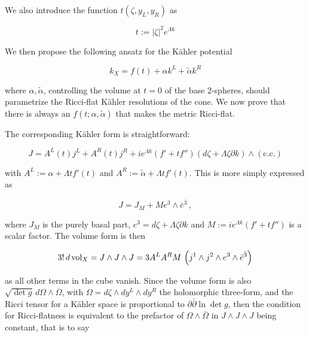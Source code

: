 We also introduce the function $t(\zeta,y_L,y_R)$ as 

\begin{equation}
	t := |\zeta|^2 e^{\Lambda k}
\end{equation}

We then propose the following ansatz for the K\"ahler potential

\begin{equation}
	k_X = f(t) + \alpha k^L + \tilde\alpha k^R
\end{equation}

where $\alpha,\tilde\alpha$, controlling the volume at $t=0$ of the base 2-spheres, should parametrize the Ricci-flat K\"ahler resolutions of the cone. We now prove that there is always an $f(t;\alpha,\tilde\alpha)$ that makes the metric Ricci-flat.

The corresponding K\"ahler form is straightforward:

\begin{equation}
	J = A^L(t) j^L + A^R(t) j^R + i e^{\Lambda k} (f' + t f'') (d\zeta + \Lambda \zeta \partial k) \wedge (\mathrm{c.c.})
\end{equation}

\newcommand{\fibral}{e^3 \wedge \bar e^{\bar 3}}

with $A^L := \alpha + \Lambda t f'(t)$ and  $A^R := \tilde\alpha + \Lambda t f'(t)$. This is more simply expressed as

\begin{equation}
J = J_M + M \fibral\,,
\end{equation}

where $J_M$ is the purely basal part, $e^3 = d\zeta + \Lambda \zeta \partial k$ and $M:= ie^{\Lambda k} \left( f' + t f'' \right)$ is a scalar factor. The volume form is then

\begin{equation}
	3!\, d\vol_X = J \wedge J \wedge J = 3 A^L A^R M \, \left( j^1 \wedge j^2 \wedge \fibral \right)
\end{equation}

as all other terms in the cube vanish. Since the volume form is also $\sqrt{\det g} \, d\Omega \wedge \overline \Omega$, with $\Omega = d\zeta \wedge dy^L \wedge dy^R$ the holomorphic three-form, and the Ricci tensor for a K\"ahler space is proportional to $\partial \bar \partial \ln \det g$, then the condition for Ricci-flatness is equivalent to the prefactor of $\Omega \wedge \bar \Omega$ in $J\wedge J \wedge J$ being constant, that is to say

